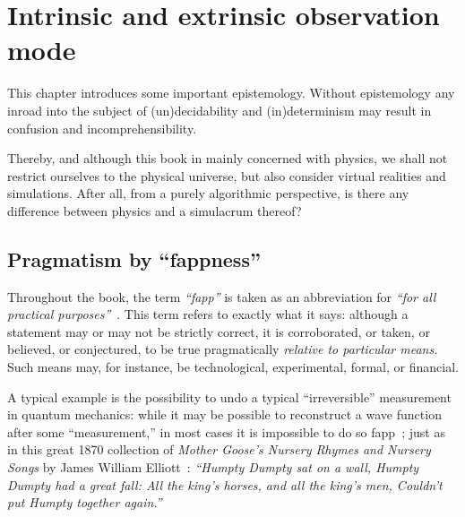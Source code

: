 %
%
%



\chapter{Intrinsic and extrinsic observation mode}
\label{2016-pu-book-chapter-inex} %

This chapter introduces some important epistemology.
Without epistemology
any inroad into the subject of (un)decidability and (in)determinism
may result in confusion and incomprehensibility.

Thereby, and although this book in mainly concerned with physics, we shall not restrict ourselves to the physical universe,
but also consider virtual realities and simulations.
After all, from a purely algorithmic perspective, is there any difference between physics and a simulacrum thereof?



\section{Pragmatism by ``fappness''}
\label{2016-pu-book-chapter-eo-fapp}

Throughout the book, the term {\em ``fapp''} is taken as an abbreviation for {\em ``for all practical purposes''}~\cite{bell-a}.
This term refers to exactly what it says: although a statement may or may not be strictly correct,
it is corroborated, or taken, or believed, or conjectured, to be true pragmatically {\em relative to particular means.}
Such means may, for instance, be technological, experimental, formal, or financial.

A typical example is the possibility to undo a typical ``irreversible'' measurement in quantum mechanics:
while it may be possible to reconstruct a wave function after some ``measurement,''
in most cases it is impossible to do so fapp~\cite{engrt-sg-I,engrt-sg-II};
just as in this great 1870 collection of {\em Mother Goose's Nursery Rhymes and Nursery Songs}
by James William Elliott~\cite[p.~30]{Elliott-1870}:
{\em ``Humpty Dumpty sat on a wall, Humpty Dumpty had a great fall: All the king's horses, and all the king's men, Couldn't put Humpty together again.''}

